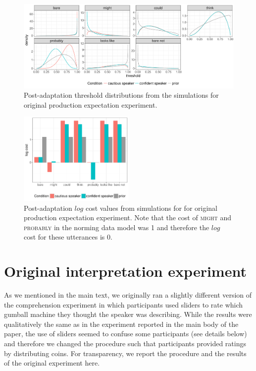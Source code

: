 \documentclass[man, floatsintext]{apa6}
\begin{document}
\begin{figure}[h!]
  \includegraphics[width=\textwidth]{plots/adaptation-posterior-thresholds.pdf}
  \caption{Post-adaptation threshold distributions from the simulations for original production expectation experiment. \label{fig:post-exposure-thresholds-original}}
\end{figure}

\begin{figure}[h!]
\center
  \includegraphics[width=0.5\textwidth]{plots/adaptation-posterior-costs.pdf}
  \caption{Post-adaptation $log$ cost values from simulations for for original production expectation experiment. Note that the cost of \textsc{might} and \textsc{probably} 
  in the norming data model was 1 and therefore the $log$ cost for these utterances is 0.  \label{fig:post-exposure-costs-original}}
\end{figure}

\pagebreak
\FloatBarrier



\section{Original interpretation experiment}
\setcounter{section}{7}
\setcounter{subsection}{0}

As we mentioned in the main text, we originally ran a slightly different version of the comprehension experiment in which participants used sliders to rate which gumball machine they thought the speaker was describing. While the results were qualitatively the same as in the experiment reported in the main body of the paper, the use of sliders seemed to confuse some participants (see details below) and therefore we changed the procedure such that participants provided ratings by distributing coins. For transparency, we report the 
procedure and the results of the original experiment here.
\end{document}
